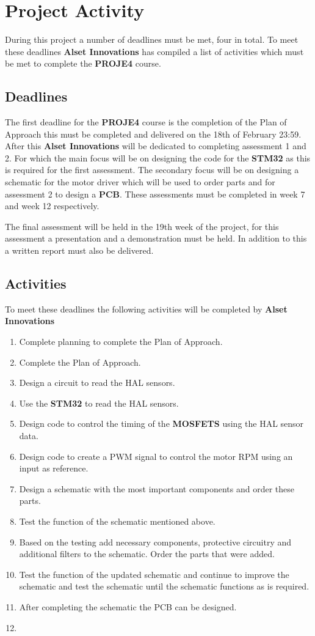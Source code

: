 \section{Project Activity}
During this project a number of deadlines must be met, four in total. To meet these deadlines \textbf{Alset Innovations} has compiled a list of activities which must be met to complete the \textbf{PROJE4} course.

\subsection{Deadlines}
The first deadline for the \textbf{PROJE4} course is the completion of the Plan of Approach this must be completed and delivered on the 18th of February 23:59. After this \textbf{Alset Innovations} will be dedicated to completing assessment 1 and 2. For which the main focus will be on designing the code for the \textbf{STM32} as this is required for the first assessment. The secondary focus will be on designing a schematic for the motor driver which will be used to order parts and for assessment 2 to design a \textbf{PCB}. These assessments must be completed in week 7 and week 12 respectively.

The final assessment will be held in the 19th week of the project, for this assessment a presentation and a demonstration must be held. In addition to this a written report must also be delivered.

\subsection{Activities}
To meet these deadlines the following activities will be completed by \textbf{Alset Innovations}

\begin{enumerate}
    \item Complete planning to complete the Plan of Approach.
    \item Complete the Plan of Approach.
    \item Design a circuit to read the HAL sensors.
    \item Use the \textbf{STM32} to read the HAL sensors.
    \item Design code to control the timing of the \textbf{MOSFETS} using the HAL sensor data.
    \item Design code to create a PWM signal to control the motor RPM using an input as reference.
    \item Design a schematic with the most important components and order these parts.
    \item Test the function of the schematic mentioned above.
    \item Based on the testing add necessary components, protective circuitry and additional filters to the schematic. Order the parts that were added.
    \item Test the function of the updated schematic and continue to improve the schematic and test the schematic until the schematic functions as is required.
    \item After completing the schematic the PCB can be designed.
    \item 
\end{enumerate}